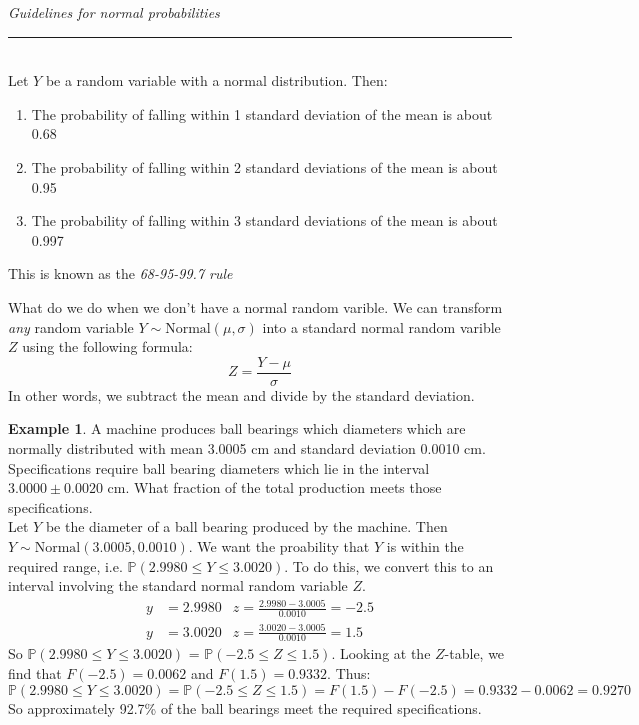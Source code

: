 \documentclass[12pt]{article}
\theoremstyle{definition}
\newtheorem*{example}{Example}
\theoremstyle{remark}
\def\P{{\mathbb P}}
\begin{document}
\begin{framed}
\emph{Guidelines for normal probabilities}\\
  \rule{\dimexpr{}\fboxrule}{.1pt} \\
Let $Y$ be a random variable with a normal distribution. Then:
\begin{enumerate}
\item The probability of falling within 1 standard deviation of the mean is about 0.68
\item The probability of falling within 2 standard deviations of the mean is about 0.95
\item The probability of falling within 3 standard deviations of the mean is about 0.997
\end{enumerate}
This is known as the \emph{68-95-99.7 rule}
\end{framed}

What do we do when we don't have a normal random varible. We can transform \emph{any} random variable $Y \sim\text{Normal}(\mu, \sigma)$ into a standard normal random varible $Z$ using the following formula:
\[
Z = \frac{Y - \mu}{\sigma}
\]
In other words, we subtract the mean and divide by the standard deviation.

\begin{example}A machine produces ball bearings which diameters which are normally distributed with mean 3.0005 cm and standard deviation 0.0010 cm. Specifications require ball bearing diameters which lie in the interval $3.0000 \pm 0.0020$ cm. What fraction of the total production meets those specifications.\\

Let $Y$ be the diameter of a ball bearing produced by the machine. Then $Y \sim\text{Normal}(3.0005, 0.0010)$. We want the proability that $Y$ is within the required range, i.e. $\P(2.9980 \leq Y \leq 3.0020)$. To do this, we convert this to an interval involving the standard normal random variable $Z$. 
\begin{align*}
y &= 2.9980 & z = \frac{2.9980 - 3.0005}{0.0010} = -2.5\\
y &= 3.0020 & z = \frac{3.0020 - 3.0005}{0.0010} = 1.5
\end{align*}
So $\P(2.9980 \leq Y \leq 3.0020)$ = $\P(-2.5 \leq Z \leq 1.5)$. Looking at the $Z$-table, we find that $F(-2.5) = 0.0062$ and $F(1.5) = 0.9332$. Thus:
\[
\P(2.9980 \leq Y \leq 3.0020) = \P(-2.5 \leq Z \leq 1.5) = F(1.5) - F(-2.5) = 0.9332 - 0.0062 = 0.9270
\]
So approximately 92.7\% of the ball bearings meet the required specifications.
\end{example}
\end{document}
